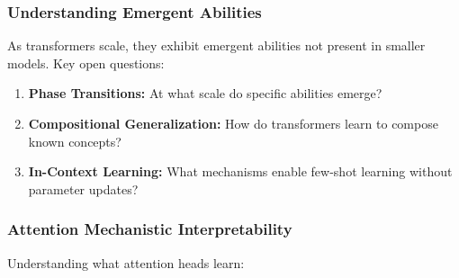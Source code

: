 \documentclass[11pt]{article}
\begin{document}
\subsubsection{Understanding Emergent Abilities}

As transformers scale, they exhibit emergent abilities not present in smaller models. Key open questions:

\begin{enumerate}
    \item \textbf{Phase Transitions:} At what scale do specific abilities emerge?
    \item \textbf{Compositional Generalization:} How do transformers learn to compose known concepts?
    \item \textbf{In-Context Learning:} What mechanisms enable few-shot learning without parameter updates?
\end{enumerate}

\subsubsection{Attention Mechanistic Interpretability}

Understanding what attention heads learn:
\end{document}
